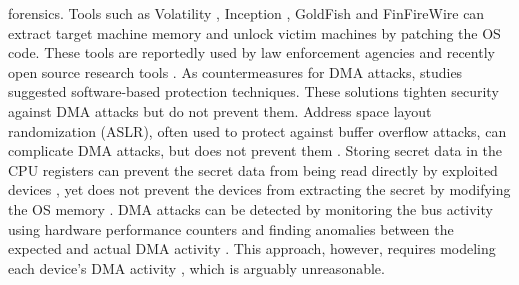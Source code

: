 forensics. Tools such as Volatility \cite{Vol}, Inception \cite{MM}, GoldFish \cite{GA10} and FinFireWire \cite{Fin14} can extract target machine memory and unlock victim machines by patching the OS code. These tools are reportedly used by law enforcement agencies and recently open source research tools \cite{thunder}. As countermeasures for DMA attacks, studies suggested software-based protection techniques. These solutions tighten security against DMA attacks but do not prevent them. Address space layout randomization (ASLR), often used to protect against buffer overflow attacks, can complicate DMA attacks, but does not prevent them \cite{SB12}. Storing secret data in the CPU registers can prevent the secret data from being read directly by exploited devices \cite{MFD11, CZG15, Sim11}, yet does not prevent the devices from extracting the secret by modifying the OS memory \cite{BR12}. DMA attacks can be detected by monitoring the bus activity using hardware performance counters and finding anomalies between the expected and actual DMA activity \cite{Ste13}. This approach, however, requires modeling each device’s DMA activity \cite{Ste14}, which is arguably unreasonable.
